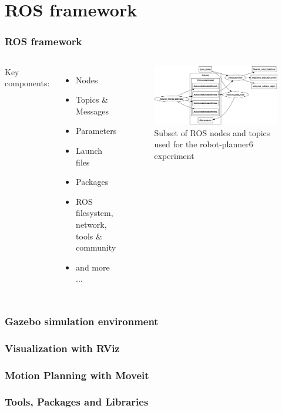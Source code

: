 \section{ROS framework}

\begin{frame}
\frametitle{ROS framework}
\begin{columns}
Key components:
\begin{itemize}
\item Nodes
\item Topics \& Messages
\item Parameters
\item Launch files
\item Packages
\item ROS filesystem, network, tools \& community
\item and more ...
\end{itemize}
\begin{center}
\begin{figure}[!htb]
\centering
\includegraphics[width=\textwidth]{../images/robot_planner6/topics-and-nodes.png}
\caption{Subset of ROS nodes and topics used for the robot-planner6 experiment}
\end{figure}
\end{center}
\end{columns}
\end{frame}

\begin{frame}
\frametitle{Gazebo simulation environment}
\end{frame}

\begin{frame}
\frametitle{Visualization with RViz}
\end{frame}

\begin{frame}
\frametitle{Motion Planning with Moveit}
\end{frame}

\begin{frame}
\frametitle{Tools, Packages and Libraries}
\end{frame}